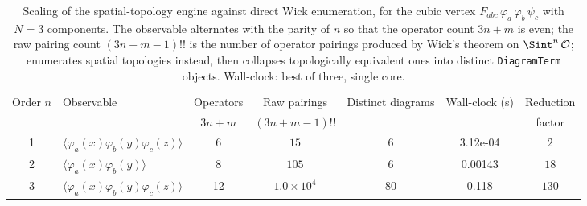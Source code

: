 \begin{table}[t]
\centering
\caption{Scaling of the spatial-topology engine against direct Wick enumeration,
for the cubic vertex $F_{abc}\,\varphi_a\,\varphi_b\,\psi_c$ with $N=3$ components.
The observable alternates with the parity of $n$ so that the operator count $3n+m$
is even; the raw pairing count $(3n{+}m{-}1)!!$ is the number of operator pairings
produced by Wick's theorem on $\Sint^n\,\mathcal{O}$; \sftwick{} enumerates spatial
topologies instead, then collapses topologically equivalent ones into distinct
\texttt{DiagramTerm} objects.  Wall-clock: best of three, single core.}
\label{tab:scaling}
\begin{tabular}{@{}clccccc@{}}
\toprule
Order $n$ & Observable & Operators & Raw pairings & Distinct diagrams & Wall-clock (s) & Reduction \\
 & & $3n{+}m$ & $(3n{+}m{-}1)!!$ & \sftwick{} & \sftwick{} & factor \\
\midrule
  1 & $\langle\varphi_a(x)\varphi_b(y)\varphi_c(z)\rangle$ & 6 & $15$ & 6 & 3.12e-04 & $2$ \\
  2 & $\langle\varphi_a(x)\varphi_b(y)\rangle$ & 8 & $105$ & 6 & 0.00143 & $18$ \\
  3 & $\langle\varphi_a(x)\varphi_b(y)\varphi_c(z)\rangle$ & 12 & $1.0\!\times\!10^{4}$ & 80 & 0.118 & $130$ \\
\bottomrule
\end{tabular}
\end{table}
